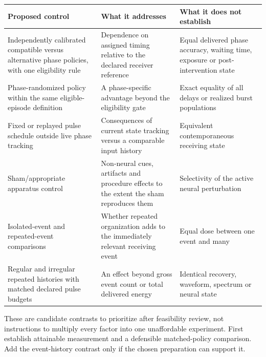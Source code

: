 \documentclass[
  american,
  11pt,
  letterpaper,
]{article}
\newcounter{none} %
\begin{document}
{\def\LTcaptype{none} %
\begin{longtable}[]{@{}
  >{\raggedright\arraybackslash}p{}
  >{\raggedright\arraybackslash}p{}
  >{\raggedright\arraybackslash}p{}@{}}
\toprule\noalign{}
\begin{minipage}[b]{\linewidth}\raggedright
Proposed control
\end{minipage} & \begin{minipage}[b]{\linewidth}\raggedright
What it addresses
\end{minipage} & \begin{minipage}[b]{\linewidth}\raggedright
What it does not establish
\end{minipage} \\
\midrule\noalign{}
\endhead
\bottomrule\noalign{}
\endlastfoot
Independently calibrated compatible versus alternative phase policies, with one eligibility rule & Dependence on assigned timing relative to the declared receiver reference & Equal delivered phase accuracy, waiting time, exposure or post-intervention state \\
Phase-randomized policy within the same eligible-episode definition & A phase-specific advantage beyond the eligibility gate & Exact equality of all delays or realized burst populations \\
Fixed or replayed pulse schedule outside live phase tracking & Consequences of current state tracking versus a comparable input history & Equivalent contemporaneous receiving state \\
Sham/appropriate apparatus control & Non-neural cues, artifacts and procedure effects to the extent the sham reproduces them & Selectivity of the active neural perturbation \\
Isolated-event and repeated-event comparisons & Whether repeated organization adds to the immediately relevant receiving event & Equal dose between one event and many \\
Regular and irregular repeated histories with matched declared pulse budgets & An effect beyond gross event count or total delivered energy & Identical recovery, waveform, spectrum or neural state \\
\end{longtable}
}

These are candidate contrasts to prioritize after feasibility review, not instructions to multiply every factor into one unaffordable experiment. First establish attainable measurement and a defensible matched-policy comparison. Add the event-history contrast only if the chosen preparation can support it.
\end{document}
